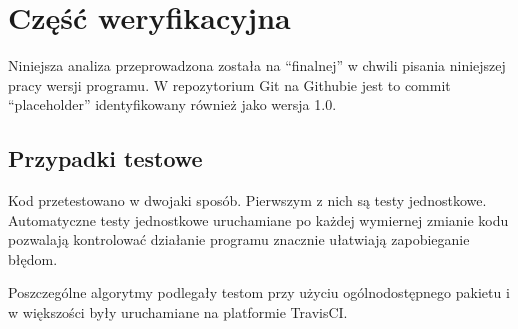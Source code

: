 \section[Weryfikacja]{Część weryfikacyjna} %
    Niniejsza analiza przeprowadzona została na ``finalnej'' w chwili pisania
    niniejszej pracy wersji programu.  W repozytorium Git na Githubie jest to
    commit ``placeholder''  identyfikowany
    również jako wersja 1.0.

    \subsection{Przypadki testowe}

    Kod przetestowano w dwojaki sposób. Pierwszym z nich są testy jednostkowe.
    Automatyczne testy jednostkowe uruchamiane po każdej wymiernej zmianie kodu
    pozwalają kontrolować działanie programu znacznie ułatwiają zapobieganie
    błędom.

    Poszczególne algorytmy podlegały testom przy użyciu ogólnodostępnego
    pakietu  i w większości były
    uruchamiane na platformie TravisCI.

